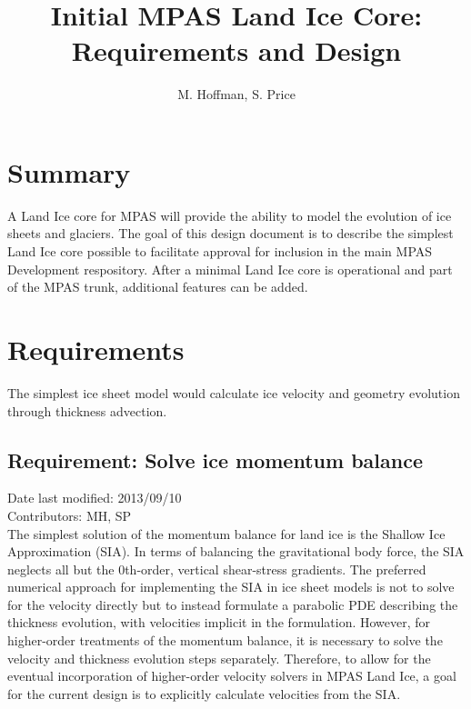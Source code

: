 \documentclass[11pt]{report}
\begin{document}
\title{Initial MPAS Land Ice Core: \\
Requirements and Design}
\author{M. Hoffman, S. Price}

\maketitle
\tableofcontents


\chapter{Summary}

A Land Ice core for MPAS will provide the ability to model the evolution of ice sheets and glaciers.  The goal of this design document is to describe the simplest Land Ice core possible to facilitate approval for inclusion in the main MPAS Development respository.  After a minimal Land Ice core is operational and part of the MPAS trunk, additional features can be added.



\chapter{Requirements}

The simplest ice sheet model would calculate ice velocity and geometry evolution through thickness advection.

\section{Requirement: Solve ice momentum balance}
Date last modified: 2013/09/10 \\
Contributors: MH, SP \\

The simplest solution of the momentum balance for land ice is the Shallow Ice Approximation (SIA). In terms of balancing the gravitational body force, the SIA neglects all but the 0th-order, vertical shear-stress gradients.  The preferred numerical approach for implementing the SIA in ice sheet models is not to solve for the velocity directly but to instead formulate a parabolic PDE describing the thickness evolution, with velocities implicit in the formulation.  However, for higher-order treatments of the momentum balance, it is necessary to solve the velocity and thickness evolution steps separately. Therefore, to allow for the eventual incorporation of higher-order velocity solvers in MPAS Land Ice, a goal for the current design is to explicitly calculate velocities from the SIA.
\end{document}
